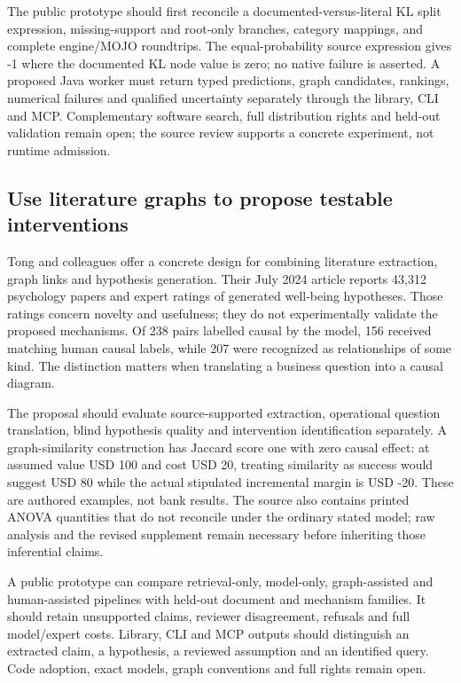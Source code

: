 The public prototype should first reconcile a documented-versus-literal
KL split expression, missing-support and root-only branches, category
mappings, and complete engine/MOJO roundtrips. The equal-probability
source expression gives -1 where the documented KL node value is zero;
no native failure is asserted. A proposed Java worker must return typed
predictions, graph candidates, rankings, numerical failures and
qualified uncertainty separately through the library, CLI and MCP.
Complementary software search, full distribution rights and held-out
validation remain open; the source review supports a concrete
experiment, not runtime admission.
\citep{exec20_javaeffects_h2o,exec20_javaeffects_tetrad,exec20_javaeffects_reference}

\hypertarget{use-literature-graphs-to-propose-testable-interventions}{%
\subsection{Use literature graphs to propose testable
interventions}\label{use-literature-graphs-to-propose-testable-interventions}}

Tong and colleagues offer a concrete design for combining literature
extraction, graph links and hypothesis generation. Their July 2024
article reports 43,312 psychology papers and expert ratings of generated
well-being hypotheses. Those ratings concern novelty and usefulness;
they do not experimentally validate the proposed mechanisms. Of 238
pairs labelled causal by the model, 156 received matching human causal
labels, while 207 were recognized as relationships of some kind. The
distinction matters when translating a business question into a causal
diagram. \citep{exec20_hypothesis_generation}

The proposal should evaluate source-supported extraction, operational
question translation, blind hypothesis quality and intervention
identification separately. A graph-similarity construction has Jaccard
score one with zero causal effect: at assumed value USD 100 and cost USD
20, treating similarity as success would suggest USD 80 while the actual
stipulated incremental margin is USD -20. These are authored examples,
not bank results. The source also contains printed ANOVA quantities that
do not reconcile under the ordinary stated model; raw analysis and the
revised supplement remain necessary before inheriting those inferential
claims. \citep{exec20_hypothesis_reference,exec20_hypothesis_generation}

A public prototype can compare retrieval-only, model-only,
graph-assisted and human-assisted pipelines with held-out document and
mechanism families. It should retain unsupported claims, reviewer
disagreement, refusals and full model/expert costs. Library, CLI and MCP
outputs should distinguish an extracted claim, a hypothesis, a reviewed
assumption and an identified query. Code adoption, exact models, graph
conventions and full rights remain open.
\citep{exec20_hypothesis_generation,exec20_hypothesis_reference}

